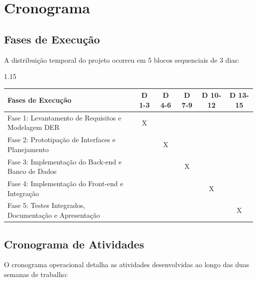 \documentclass[12pt,a4paper]{article}
\begin{document}
\newpage


\section{Cronograma}

\subsection{Fases de Execução}

A distribuição temporal do projeto ocorreu em 5 blocos sequenciais de 3 dias:

\vspace{0.3cm}

\noindent
\begin{spacing}{1.15}
\begin{tabularx}{\textwidth}{|X|c|c|c|c|c|}
\hline
\textbf{Fases de Execução} & \textbf{D 1-3} & \textbf{D 4-6} & \textbf{D 7-9} & \textbf{D 10-12} & \textbf{D 13-15} \\ \hline
Fase 1: Levantamento de Requisitos e Modelagem DER & X & & & & \\ \hline
Fase 2: Prototipação de Interfaces e Planejamento & & X & & & \\ \hline
Fase 3: Implementação do Back-end e Banco de Dados & & & X & & \\ \hline
Fase 4: Implementação do Front-end e Integração & & & & X & \\ \hline
Fase 5: Testes Integrados, Documentação e Apresentação & & & & & X \\ \hline
\end{tabularx}
\end{spacing}

\subsection{Cronograma de Atividades}

O cronograma operacional detalha as atividades desenvolvidas ao longo das duas semanas de trabalho:
\end{document}
